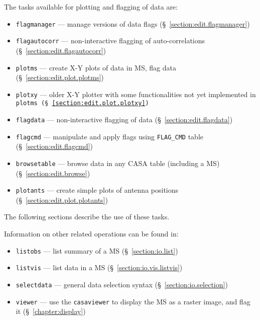 The tasks available for plotting and flagging of data are:
\begin{itemize}
   \item {\tt flagmanager} --- manage versions of data flags
      (\S~\ref{section:edit.flagmanager})
   \item {\tt flagautocorr} --- non-interactive flagging of auto-correlations
      (\S~\ref{section:edit.flagautocorr})
   \item {\tt plotms} --- create X-Y plots of data in MS, flag data
      (\S~\ref{section:edit.plot.plotms})
   \item {\tt plotxy} --- older X-Y plotter with some functionalities not yet implemented in \tt{plotms}
      (\S~\ref{section:edit.plot.plotxy})
   \item {\tt flagdata} --- non-interactive flagging of data
      (\S~\ref{section:edit.flagdata})
   \item {\tt flagcmd} --- manipulate and apply flags using {\tt FLAG\_CMD} table
      (\S~\ref{section:edit.flagcmd})
   \item {\tt browsetable} --- browse data in any CASA table (including a MS)
      (\S~\ref{section:edit.browse})
   \item {\tt plotants} --- create simple plots of antenna positions
      (\S~\ref{section:edit.plot.plotants})
\end{itemize}

The following sections describe the use of these tasks.

Information on other related operations can be found in:
\begin{itemize}
   \item {\tt listobs} --- list summary of a MS (\S~\ref{section:io.list})
   \item {\tt listvis} --- list data in a MS (\S~\ref{section:io.vis.listvis})
   \item {\tt selectdata} --- general data selection syntax
      (\S~\ref{section:io.selection})
   \item {\tt viewer} --- use the {\tt casaviewer} to display the MS as a 
      raster image, and flag it (\S~\ref{chapter:display})

\end{itemize}

